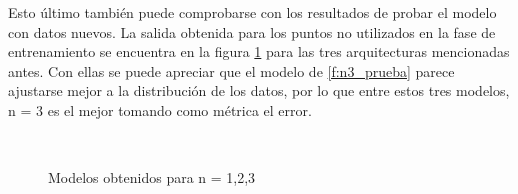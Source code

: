 \documentclass[a4paper]{article}
\begin{document}
Esto último también puede comprobarse con los resultados de probar el modelo con datos nuevos. La salida obtenida para los puntos no utilizados en la fase de entrenamiento se encuentra en la figura \ref{f:aprox1-2-3} para las tres arquitecturas mencionadas antes. Con ellas se puede apreciar que el modelo de \ref{f:n3_prueba} parece ajustarse mejor a la distribución de los datos, por lo que entre estos tres modelos, n = 3 es el mejor tomando como métrica el error.
	
	\begin{figure}[H]
	\centering
	\\
	\caption{Modelos obtenidos para n = 1,2,3}
	\label{f:aprox1-2-3}
	\end{figure}
\end{document}
